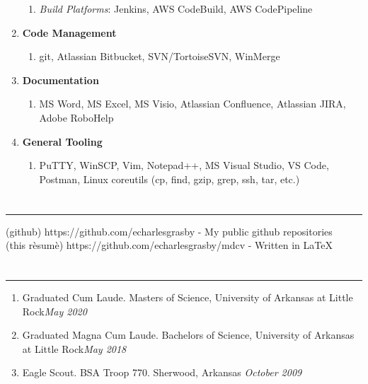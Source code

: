 \documentclass[11pt]{article}
\newcommand{\ualr}{University of Arkansas at Little Rock}
\newcommand{\uppr}[3]{ \noindent\MakeUppercase{{\fontsize{#2}{#3} \selectfont {#1}}} }
\begin{document}
\begin{enumerate}[topsep=0pt, partopsep=0pt, label=\null]
\begin{enumerate}[topsep=0pt, partopsep=0pt, label=\null]
  \item \textit{Build Platforms}: Jenkins, AWS CodeBuild, AWS CodePipeline
  \end{enumerate}
\item \textbf{Code Management}
  \begin{enumerate}[topsep=0pt, partopsep=0pt, label=\null]
  \item git, Atlassian Bitbucket, SVN/TortoiseSVN, WinMerge
  \end{enumerate}
\item \textbf{Documentation}
  \begin{enumerate}[topsep=0pt, partopsep=0pt, label=\null]
  \item MS Word, MS Excel, MS Visio, Atlassian Confluence, Atlassian JIRA, Adobe RoboHelp
  \end{enumerate}
\item \textbf{General Tooling}
  \begin{enumerate}[topsep=0pt, partopsep=0pt, label=\null]
  \item PuTTY, WinSCP, Vim, Notepad++, MS Visual Studio, VS Code, Postman, Linux coreutils (cp, find, gzip, grep, ssh, tar, etc.)
  \end{enumerate}

\end{enumerate}

\section*{\uppr{Projects}{14}{16}}\noindent \rule{1.0\textwidth}{0.4pt}
(github) https://github.com/echarlesgrasby - My public github repositories \\
(this r\`esum\`e) https://github.com/echarlesgrasby/mdcv - Written in {\LaTeX}
\section*{\uppr{Accolades}{14}{16}}\noindent \rule{1.0\textwidth}{0.4pt}
\setlength{\leftmargini}{0pt}
\begin{enumerate}[topsep=0pt, partopsep=0pt, label=\null]
\item Graduated Cum Laude. Masters of Science, \ualr \hfill \textit{May 2020}
\item Graduated Magna Cum Laude. Bachelors of Science, \ualr \hfill \textit{May 2018}
\item Eagle Scout. BSA Troop 770. Sherwood, Arkansas \hfill \textit{October 2009}
\end{enumerate}
\end{document}
